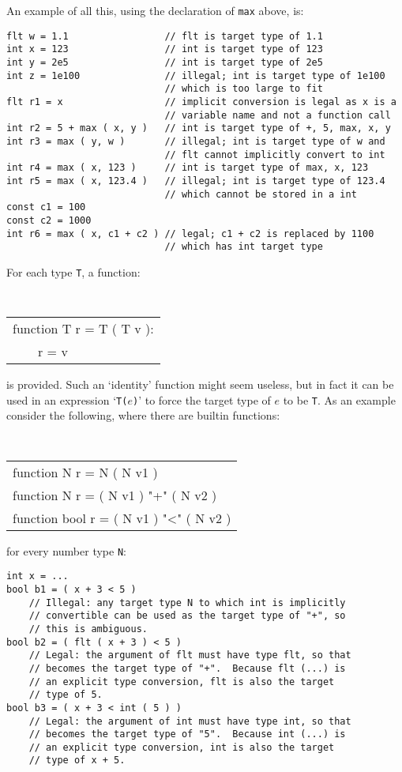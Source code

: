 \documentclass[12pt]{article}
\newenvironment{indpar}[1][0.3in]%
	{\begin{list}{}%
		     {\setlength{\itemsep}{0in}%
		      \setlength{\topsep}{0in}%
		      \setlength{\parsep}{1ex}%
		      \setlength{\labelwidth}{#1}%
		      \setlength{\leftmargin}{#1}%
		      \addtolength{\leftmargin}{\labelsep}}%
	 \item}%
	{\end{list}}
\begin{document}
An example of all this, using the declaration of {\tt max} above, is:

\begin{indpar}\begin{verbatim}
flt w = 1.1                 // flt is target type of 1.1
int x = 123                 // int is target type of 123
int y = 2e5                 // int is target type of 2e5
int z = 1e100               // illegal; int is target type of 1e100
                            // which is too large to fit
flt r1 = x                  // implicit conversion is legal as x is a
                            // variable name and not a function call
int r2 = 5 + max ( x, y )   // int is target type of +, 5, max, x, y
int r3 = max ( y, w )       // illegal; int is target type of w and
                            // flt cannot implicitly convert to int
int r4 = max ( x, 123 )     // int is target type of max, x, 123
int r5 = max ( x, 123.4 )   // illegal; int is target type of 123.4
                            // which cannot be stored in a int
const c1 = 100
const c2 = 1000
int r6 = max ( x, c1 + c2 ) // legal; c1 + c2 is replaced by 1100
                            // which has int target type
\end{verbatim}\end{indpar}

For each type {\tt T}, a function:
\begin{center} \tt
\begin{tabular}{l}
function T r = T ( T v ): \\
~~~~r = v
\end{tabular}
\end{center}
is provided.  Such an `identity' function might seem useless,
but in fact it can be used in an expression `{\tt T($e$)}' to
force the target type of $e$ to be {\tt T}.  As an example
consider the following, where there are builtin functions:
\begin{center} \tt
\begin{tabular}{l}
function N r = N ( N v1 ) \\
function N r = ( N v1 ) "+" ( N v2 ) \\
function bool r = ( N v1 ) "<" ( N v2 ) \\
\end{tabular}
\end{center}
for every number type {\tt N}:

\begin{indpar}\begin{verbatim}
int x = ...
bool b1 = ( x + 3 < 5 )
    // Illegal: any target type N to which int is implicitly
    // convertible can be used as the target type of "+", so
    // this is ambiguous.
bool b2 = ( flt ( x + 3 ) < 5 )
    // Legal: the argument of flt must have type flt, so that
    // becomes the target type of "+".  Because flt (...) is
    // an explicit type conversion, flt is also the target
    // type of 5.
bool b3 = ( x + 3 < int ( 5 ) )
    // Legal: the argument of int must have type int, so that
    // becomes the target type of "5".  Because int (...) is
    // an explicit type conversion, int is also the target
    // type of x + 5.
\end{verbatim}\end{indpar}
\end{document}
